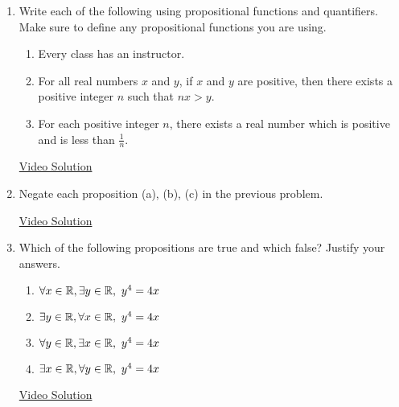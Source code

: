 \begin{enumerate}
	\item Write each of the following using propositional functions and quantifiers. Make sure to define any propositional functions you are using.
  \begin{enumerate}
   	\item Every class has an instructor.
		\item For all real numbers $x$ and $y$, if $x$ and $y$ are positive, then there exists a positive integer $n$ such that $nx > y$.
		\item For each positive integer $n$, there exists a real number which is positive and is less than $\frac 1n$.
  \end{enumerate}
  
  \href{https://youtu.be/6XgjXmTefw8}{Video Solution}
  
  \item Negate each proposition (a), (b), (c) in the previous problem.
  
  \href{https://youtu.be/wXZ72O47aV8}{Video Solution}
  
  \item Which of the following propositions are true and which false? Justify your answers.
	\begin{enumerate}
	  \item $\forall x\in\R,\exists y\in\R,\ y^4=4x$
	  \item $\exists y\in\R,\forall x\in\R,\ y^4=4x$
	  \item $\forall y\in\R,\exists x\in\R,\ y^4=4x$
	  \item $\exists x\in\R,\forall y\in\R,\ y^4=4x$
	\end{enumerate}
	
	\href{https://youtu.be/lfI_1HFK7uc}{Video Solution}
\end{enumerate}